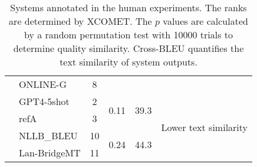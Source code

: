 \begin{table}[ht]
{\begin{tabular}{@{}p{0.1cm}p{1.51cm}cp{0.3cm}p{0.4cm}p{2.1cm}@{}}
                                       & ONLINE-G   & 8   & & & \\\cmidrule{2-6}
                                       & GPT4-5shot & 2  & \multirow{2}{*}{0.11} & \multirow{2}{*}{39.3} & \multirow{4}{*}{Lower text similarity} \\
                                       & refA       & 3   & & & \\\cmidrule{2-5}
                                       & NLLB\_BLEU & 10 & \multirow{2}{*}{0.24} & \multirow{2}{*}{44.3} & \\
                                       & Lan-BridgeMT  & 11 & & & \\\midrule
\end{tabular}%
}
\caption{Systems annotated in the human experiments. The ranks are determined by XCOMET. The $p$ values are calculated by a random permutation test with 10000 trials to determine quality similarity. Cross-BLEU quantifies the text similarity of system outputs.
}
\label{tab:sys_pairs}
\vspace{-3pt}
\end{table}
